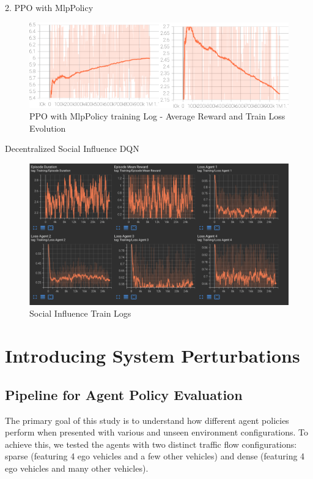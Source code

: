2. PPO with MlpPolicy

\begin{figure}[H]
    \centering
    \includegraphics[height=0.20\textheight]{images/ppo_mlp.png} 
    \caption{PPO with MlpPolicy training Log - Average Reward and Train Loss Evolution}
\end{figure}


Decentralized Social Influence DQN


\begin{figure}[h]
    \centering
    \includegraphics[scale=0.5]{images/dqn_SI_metrics.png}
    \caption{Social Influence Train Logs}
    \label{fig:social influence}
\end{figure}


\section{Introducing System Perturbations}

\subsection{Pipeline for Agent Policy Evaluation}

The primary goal of this study is to understand how different agent policies perform when presented with various and unseen environment configurations. 
To achieve this, we tested the agents with two distinct traffic flow configurations: sparse (featuring 4 ego vehicles and a few other vehicles) 
and dense (featuring 4 ego vehicles and many other vehicles). 

